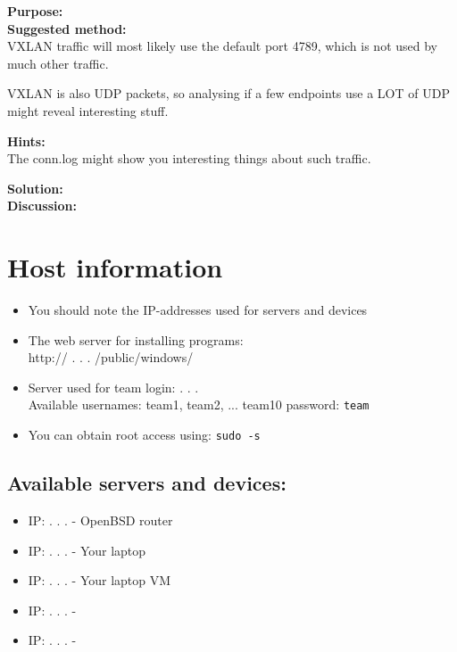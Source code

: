 \documentclass[a4paper,11pt,notitlepage]{report}
\begin{document}
{\bf Purpose:}\\



{\bf Suggested method:}\\
VXLAN traffic will most likely use the default port 4789, which is not used by much other traffic.

VXLAN is also UDP packets, so analysing if a few endpoints use a LOT of UDP might reveal interesting stuff.


{\bf Hints:}\\
The conn.log might show you interesting things about such traffic.


{\bf Solution:}\\



{\bf Discussion:}\\



\appendix
\rhead{\fancyplain{}{\bf \leftmark}}

\normal

\chapter{\color{titlecolor}Host information}

\begin{itemize}
\item You should note the IP-addresses used for servers and devices
\item The web server for installing programs:\\
http:// \hskip 15mm .\hskip 15mm .\hskip 15mm .\hskip 15mm
/public/windows/
\item Server used for team login: \hskip 15mm .\hskip 15mm .\hskip 15mm .\hskip 15mm \\
Available usernames: team1, team2, ... team10
password: \verb+team+
\item You can obtain root access using: \verb+sudo -s+
\end{itemize}

\section*{\color{titlecolor}Available servers and devices:}
\begin{itemize}
\item IP: \hskip 15mm .\hskip 15mm .\hskip 15mm .\hskip 15mm - OpenBSD router
\item IP: \hskip 15mm .\hskip 15mm .\hskip 15mm .\hskip 15mm - Your laptop
\item IP: \hskip 15mm .\hskip 15mm .\hskip 15mm .\hskip 15mm - Your laptop VM
\item IP: \hskip 15mm .\hskip 15mm .\hskip 15mm .\hskip 15mm -
\item IP: \hskip 15mm .\hskip 15mm .\hskip 15mm .\hskip 15mm -
\end{itemize}



%



\end{document}
